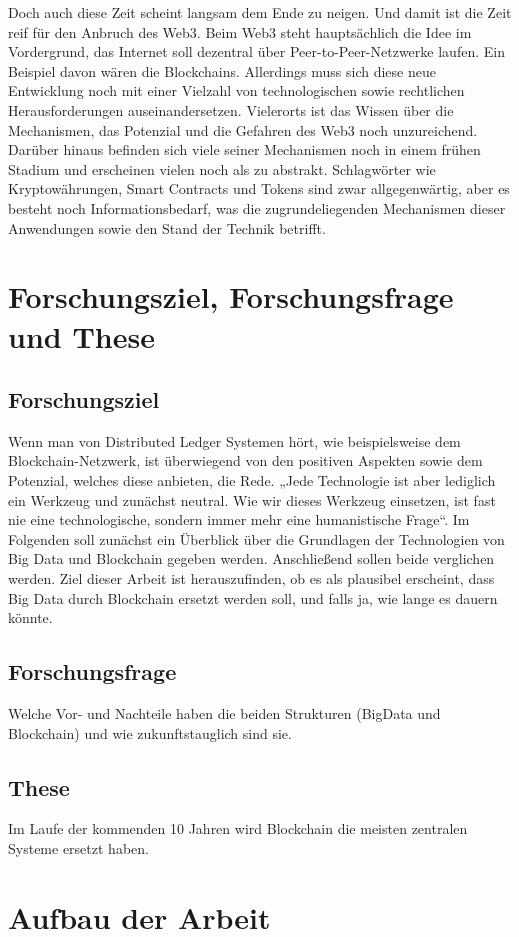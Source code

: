 Doch auch diese Zeit scheint langsam dem Ende zu neigen. Und damit ist die Zeit reif für den Anbruch des Web3. Beim Web3 steht hauptsächlich die Idee im Vordergrund, das Internet soll dezentral über Peer-to-Peer-Netzwerke laufen. Ein Beispiel davon wären die Blockchains. Allerdings muss sich diese neue Entwicklung noch mit einer Vielzahl von technologischen sowie rechtlichen Herausforderungen auseinandersetzen. Vielerorts ist das Wissen über die Mechanismen, das Potenzial und die Gefahren des Web3 noch unzureichend. Darüber hinaus befinden sich viele seiner Mechanismen noch in einem frühen Stadium und erscheinen vielen noch als zu abstrakt. Schlagwörter wie Kryptowährungen, Smart Contracts und Tokens sind zwar allgegenwärtig, aber es besteht noch Informationsbedarf, was die zugrundeliegenden Mechanismen dieser Anwendungen sowie den Stand der Technik betrifft.

\section{Forschungsziel, Forschungsfrage und These}
\subsection{Forschungsziel}
Wenn man von Distributed Ledger Systemen hört, wie beispielsweise dem Blockchain-Netzwerk, ist überwiegend von den positiven Aspekten sowie dem Potenzial, welches diese anbieten, die Rede. „Jede Technologie ist aber lediglich ein Werkzeug und zunächst neutral. Wie wir dieses Werkzeug einsetzen, ist fast nie eine technologische, sondern immer mehr eine humanistische Frage“.
Im Folgenden soll zunächst ein Überblick über die Grundlagen der Technologien von Big Data und Blockchain gegeben werden. Anschließend sollen beide verglichen werden. Ziel dieser Arbeit ist herauszufinden, ob es als plausibel erscheint, dass Big Data durch Blockchain ersetzt werden soll, und falls ja, wie lange es dauern könnte.
\subsection{Forschungsfrage}
Welche Vor- und Nachteile haben die beiden Strukturen (BigData und Blockchain) und wie zukunftstauglich sind sie.
\subsection{These}
Im Laufe der kommenden 10 Jahren wird Blockchain die meisten zentralen Systeme ersetzt haben.



\section{Aufbau der Arbeit}

